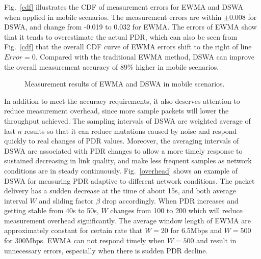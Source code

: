 \documentclass[draftclsnofoot,journal,onecolumn,11pt]{IEEEtran}
\begin{document}
Fig.~\ref{cdf} illustrates the CDF of measurement errors for EWMA and DSWA when applied in mobile scenarios. The measurement errors are within $\pm$0.008 for DSWA, and change from -0.019 to 0.032 for EWMA. The errors of EWMA show that it tends to overestimate the actual PDR, which can also be seen from Fig.~\ref{cdf} that the overall CDF curve of EWMA errors shift to the right of line $Error=0$. Compared with the traditional EWMA method, DSWA can improve the overall measurement accuracy of 89\% higher in mobile scenarios.
\begin{figure}[!t]
\centerline{
}
\caption{Measurement results of EWMA and DSWA in mobile scenarios.}
\label{DSWA_error}
\end{figure}

In addition to meet the accuracy requirements, it also deserves attention to reduce measurement overhead, since more sample packets will lower the throughput achieved. The sampling intervals of DSWA are weighted average of last $n$ results so that it can reduce mutations caused by noise and respond quickly to real changes of PDR values. Moreover, the averaging intervals of DSWA are associated with PDR changes to allow a more timely response to sustained decreasing in link quality, and make less frequent samples as network conditions are in steady continuously. Fig.~\ref{overhead} shows an example of DSWA for measuring PDR adaptive to different network conditions. The packet delivery has a sudden decrease at the time of about 15s, and both average interval $W$ and sliding factor $\beta$ drop accordingly. When PDR increases and getting stable from 40s to 50s, $W$ changes from 100 to 200 which will reduce measurement overhead significantly. The average window length of EWMA are approximately constant for certain rate that $W=20$ for 6.5Mbps and $W=500$ for 300Mbps. EWMA can not respond timely when $W=500$ and result in unnecessary errors, especially when there is sudden PDR decline.
\end{document}
